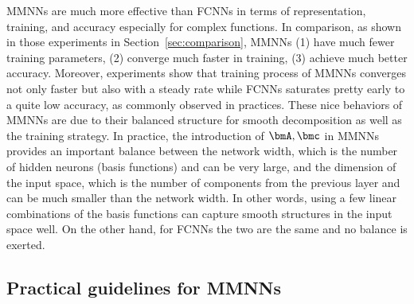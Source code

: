 \documentclass[review,hidelinks,onefignum,onetabnum]{siamart250211}
\begin{document}
    MMNNs are much more effective than FCNNs in terms of representation, training, and accuracy especially for complex functions. In comparison, as shown in those experiments in Section~\ref{sec:comparison}, MMNNs (1) have much fewer training parameters, (2) converge much faster in training, (3) achieve much better accuracy. Moreover, experiments show that training process of MMNNs converges not only faster but also with a steady rate while FCNNs saturates pretty early to a quite low accuracy, as commonly observed in practices. These nice  behaviors of MMNNs are due to their balanced structure for smooth decomposition as well as the training strategy. In practice, 
    the introduction of $\bmA, \bmc$ in MMNNs provides an important balance between the network width, which is the number of hidden neurons (basis functions) and can be very large, and the dimension of the input space, which is the number of components from the previous layer and can be much smaller than the network width. In other words, using a few linear combinations of the basis functions can capture smooth structures in the input space well. On the other hand, for FCNNs the two are the same and no balance is exerted.  



\subsection{Practical guidelines for MMNNs}
\label{sec:guideline:MMNN:size}
\end{document}
